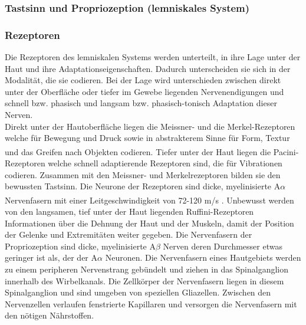 \documentclass[12pt,a4paper,pdftex]{article}
\begin{document}
\subsubsection{Tastsinn und Propriozeption (lemniskales System)}

\subsubsection*{Rezeptoren}
Die Rezeptoren des lemniskalen Systems werden unterteilt, in ihre Lage unter der Haut und ihre Adaptationseigenschaften. Dadurch unterscheiden sie sich in der Modalität, die sie codieren. Bei der Lage wird unterschieden zwischen direkt unter der Oberfläche oder tiefer im Gewebe liegenden Nervenendigungen und schnell bzw. phasisch und langsam bzw. phasisch-tonisch Adaptation dieser Nerven.\\
Direkt unter der Hautoberfläche liegen die Meissner- und die Merkel-Rezeptoren welche für Bewegung und Druck sowie in abstrakterem Sinne für Form, Textur und das Greifen nach Objekten codieren. \textsuperscript{\cite[24]{paxinos2014rat}} Tiefer unter der Haut liegen die Pacini-Rezeptoren welche schnell adaptierende Rezeptoren sind, die für Vibrationen codieren. Zusammen mit den Meissner- und Merkelrezeptoren bilden sie den bewussten Tastsinn. Die Neurone der Rezeptoren sind dicke, myelinisierte A$\alpha$ Nervenfasern mit einer Leitgeschwindigkeit von 72-120 m/s \textsuperscript{\cite[22]{kandel2013principles}}. Unbewusst werden von den langsamen, tief unter der Haut liegenden Ruffini-Rezeptoren Informationen über die Dehnung der Haut und der Muskeln, damit der Position der Gelenke und Extremitäten weiter gegeben.
Die Nervenfasern der Propriozeption sind dicke, myelinisierte A$\beta$ Nerven deren Durchmesser etwas geringer ist als, der der A$\alpha$ Neuronen.
Die Nervenfasern eines Hautgebiets werden zu einem peripheren Nervenstrang gebündelt und ziehen in das Spinalganglion innerhalb des Wirbelkanals. Die Zellkörper der Nervenfasern liegen in diesem Spinalganglion und sind umgeben von speziellen Gliazellen. Zwischen den Nervenzellen verlaufen fenstrierte Kapillaren und versorgen die Nervenfasern mit den nötigen Nährstoffen. 
\end{document}
